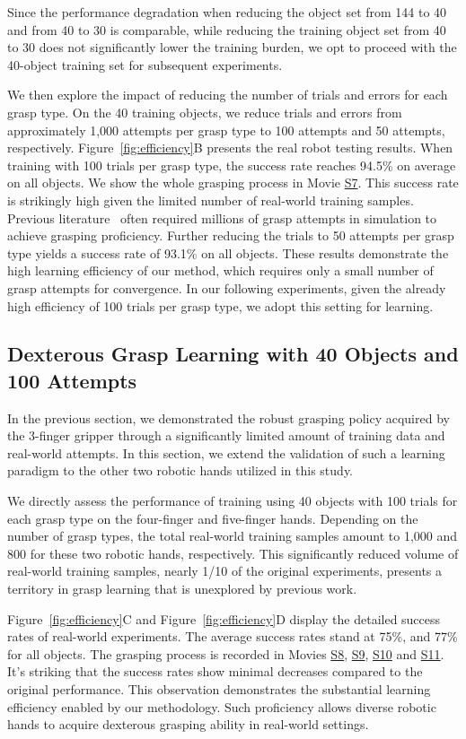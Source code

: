 Since the performance degradation when reducing the object set from 144 to 40 and from 40 to 30 is comparable, while reducing the training object set from 40 to 30 does not significantly lower the training burden, we opt to proceed with the 40-object training set for subsequent experiments.

We then explore the impact of reducing the number of trials and errors for each grasp type. On the 40 training objects, we reduce trials and errors from approximately 1,000 attempts per grasp type to 100 attempts and 50 attempts, respectively. Figure~\ref{fig:efficiency}B presents the real robot testing results. When training with 100 trials per grasp type, the success rate reaches 94.5\% on average on all objects. We show the whole grasping process in Movie \hyperlink{movie_s7}{S7}. This success rate is strikingly high given the limited number of real-world training samples. Previous literature~\cite{xu2023unidexgrasp,liu2023dexrepnet} often required millions of grasp attempts in simulation to achieve grasping proficiency. Further reducing the trials to 50 attempts per grasp type yields a success rate of 93.1\% on all objects. These results demonstrate the high learning efficiency of our method, which requires only a small number of grasp attempts for convergence. In our following experiments, given the already high efficiency of 100 trials per grasp type, we adopt this setting for learning.

\subsection{Dexterous Grasp Learning with 40 Objects and 100 Attempts}
In the previous section, we demonstrated the robust grasping policy acquired by the 3-finger gripper through a significantly limited amount of training data and real-world attempts. In this section, we extend the validation of such a learning paradigm to the other two robotic hands utilized in this study.

We directly assess the performance of training using 40 objects with 100 trials for each grasp type on the four-finger and five-finger hands. Depending on the number of grasp types, the total real-world training samples amount to 1,000 and 800 for these two robotic hands, respectively. This significantly reduced volume of real-world training samples, nearly 1/10 of the original experiments, presents a territory in grasp learning that is unexplored by previous work.

Figure~\ref{fig:efficiency}C and Figure~\ref{fig:efficiency}D display the detailed success rates of real-world experiments. The average success rates stand at 75\%, and 77\% for all objects. The grasping process is recorded in Movies \hyperlink{movie_s8}{S8}, \hyperlink{movie_s9}{S9}, \hyperlink{movie_s10}{S10} and \hyperlink{movie_s11}{S11}. It's striking that the success rates show minimal decreases compared to the original performance. This observation demonstrates the substantial learning efficiency enabled by our methodology. Such proficiency allows diverse robotic hands to acquire dexterous grasping ability in real-world settings. 

